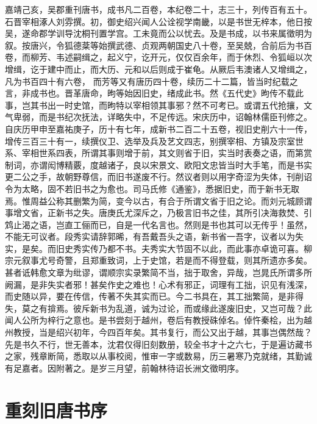 \documentclass[12pt,UTF8]{ctexbook}
\begin{document}
	嘉靖己亥，吴郡重刊唐书，成书凡二百卷，本纪卷二十，志三十，列传百有五十。石晋宰相涿人刘雰撰。初，御史绍兴闻人公诠视学南畿，以是书世无梓本，他日按吴，遂命郡学训导沈桐刊置学宫。工未竟而公以忧去。及是书成，以书来属徵明为叙。按唐兴，令狐德棻等始撰武德、贞观两朝国史八十卷，至吴兢，合前后为书百卷，而柳芳、韦述嗣缉之，起义宁，讫开元，仅仅百余年，而于休烈、令狐峘以次增缉，讫于建中而止，而大历、元和以后则成于崔龟。从厥后韦澳诸人又增缉之，凡为书百四十有六卷，
	而芳等又有唐历四十卷，续历二十二篇，皆当时纪载之言，非成书也。晋革唐命，昫等始因旧史，绪成此书。然《五代史》昫传不载此事，岂其书出一时史馆，而昫特以宰相领其事邪？然不可考已。或谓五代抢攘，文气卑弱，而是书纪次抚法，详略失中，不足传远。宋庆历中，诏翰林儒臣刊修之。自庆历甲申至嘉祐庚子，历十有七年，成新书二百二十五卷，视旧史削六十一传，增传三百三十有一，续撰仪卫、选举及兵及艺文四志，别撰宰相、方镇及宗室世系、宰相世系四表，所谓其事则增于前，其文则省于旧，实当时表奏之语，而第赏制词，亦谓闳博精覈，度越诸子，良以宋景文、欧阳文忠皆当时大手笔，而是书实更二公之手，故朝野尊信，而旧书遂废不行。然议者则以用字奇涩为失体，刊削诏令为太略，固不若旧书之为愈也。司马氏修《通鉴》，悉据旧史，而于新书无取焉。惟周益公称其删繁为简，变今以古，有合于所谓文省于旧之论。而刘元城顾谓事增文省，正新书之失。唐庚氏尤深斥之，乃极言旧书之佳，其所引决海救焚、引鸩止渴之语，岂直工俪而已，自是一代名言也。然则是书也其可以无传乎！虽然，不能无可议者。段秀实请辞郭晞，有吾戴吾头之语，新书省一吾字，议者以为失实，是矣。而旧史秀实传乃都不书。夫秀实大节固不以此，而此事亦卓诡可喜。柳宗元叙事尤号奇警，且郑重致词，上于史馆，若是而不得登载，则其所遗亦多矣。甚者诋韩愈文章为纰谬，谓顺宗实录繁简不当，拙于取舍，异哉，岂晁氏所谓多所阙漏，是非失实者邪！甚矣作史之难也！心术有邪正，词理有工拙，识见有浅深，而史随以异，要在传信，传著不失其实而已。今二书具在，其工拙繁简，是非得失，莫之有揜焉。彼斥新书为乱道，诚为过论，而或缘此遂废旧史，又岂可哉？此闻人公所为梓行之意也。是书尝刻于越州，卷后有教授硃倬名。倬忤秦桧，出为越州教授，当是绍兴初年，今四百年矣。其书复行，而公又出于越，其事岂偶然哉？先是书久不行，世无善本，沈君仅得旧刻数册，较全书才十之六七，于是遍访藏书之家，残章断简，悉取以从事校阅，惟审一字或数易，历三暑寒乃克就绪，其勤诚有足嘉者。因附著之。是岁三月望，前翰林待诏长洲文徵明序。
	
\chapter{重刻旧唐书序}
	
\end{document}
